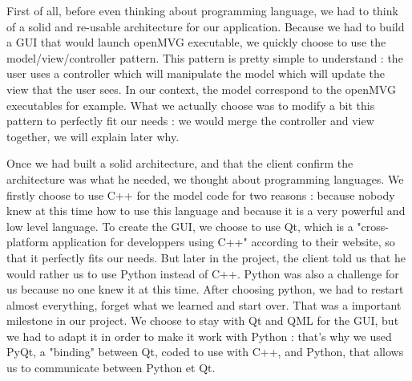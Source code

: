First of all, before even thinking about programming language, we had to think of a solid and re-usable architecture for
our application. Because we had to build a GUI that would launch openMVG executable, we quickly choose to use the 
model/view/controller pattern. This pattern is pretty simple to understand : the user uses a controller which will manipulate
the model which will update the view that the user sees. In our context, the model correspond to the openMVG executables for example. 
What we actually choose was to modify a bit this pattern to perfectly fit our needs : we would merge the controller and view
together, we will explain later why.

Once we had built a solid architecture, and that the client confirm the architecture was what he needed, we thought about 
programming languages. We firstly choose to use C++ for the model code for two reasons : because nobody knew at this time 
how to use this language and because it is a very powerful and low level language. To create the GUI, we choose to use Qt, which
is a "cross-platform application for developpers using C++"  according to their website, so that it perfectly fits our needs. But later in
the project, the client told us that he would rather us to use Python instead of C++. Python was also a challenge for us because no one knew it at 
this time. After choosing python, we had to restart almost everything, forget what we learned and start over. That was a important milestone in our
project. We choose to stay with Qt and QML for the GUI, but we had to adapt it in order to make it work with Python : that's why we used PyQt, a "binding" between
Qt, coded to use with C++, and Python, that allows us to communicate between Python et Qt. 

